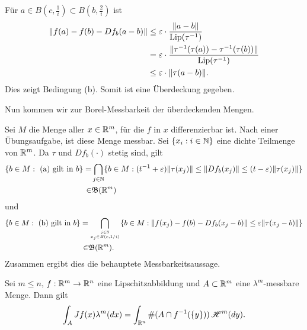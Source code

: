 \documentclass[a4paper,twoside,DIV15,BCOR12mm]{scrbook}
\newcommand{\HM}{\mathscr H}
\DeclareMathOperator{\Lip}{Lip}
\begin{document}
\begin{beweis}
Für $a\in B(c,\frac1i) \subset B(b,\frac2i)$ ist 
\begin{align*}
\|f(a) - f(b) - Df_b(a-b)\|
&\le \ep\cdot\frac{\|a-b\|}{\Lip(\tau^{-1})} \\
&= \ep\cdot\frac{\|\tau^{-1}(\tau(a)) - \tau^{-1}(\tau(b))\|}{\Lip(\tau^{-1})} \\
&\le \ep\cdot \|\tau(a-b)\|.
\end{align*}
Dies zeigt Bedingung (b). Somit ist eine Überdeckung gegeben.

Nun kommen wir zur Borel-Messbarkeit der überdeckenden Mengen.

Sei $M$ die Menge aller $x\in \mathbb{R}^m$, für die $f$ in $x$ differenzierbar ist. Nach einer 
Übungsaufgabe, ist diese Menge messbar. Sei $\{x_i:i\in \mathbb{N}\}$ eine dichte Teilmenge von $\mathbb{R}^m$. 
Da $\tau $ und $Df_b(\cdot)$ stetig sind, gilt
\begin{align*}
\{b\in M:\text{ (a) gilt in } b\}=&\bigcap_{j\in\mathbb{N}}\{b\in M:(t^{-1}+\varepsilon)\|\tau(x_j)\|\le \|Df_b(x_j)\|\le (t-\varepsilon)\|\tau(x_j)\|\}\\
\in &\mathfrak{B}(\mathbb{R}^m)
\end{align*}
und
\begin{align*}
\{b\in M:\text{ (b) gilt in } b\}=&\bigcap_{j\in\mathbb{N}\atop x_j\in B(c,1/i)}\{b\in M:
\|f(x_j)-f(b)-Df_b(x_j-b)\|\le\varepsilon\|\tau(x_j-b)\|\}\\
\in &\mathfrak{B}(\mathbb{R}^m).
\end{align*}
Zusammen ergibt dies die behauptete Messbarkeitsaussage.
\end{beweis}

\begin{satz}
Sei $m\le n$, $f:\mathbb{R}^m\to\mathbb{R}^n$ eine Lipschitzabbildung und $A\subset\mathbb{R}^m$ eine $\lambda^m$-messbare Menge. Dann gilt
\[
\int_A Jf(x) \lambda^m(dx) = \int_{\MdR^n} \#(A\cap f^{-1}(\{y\}))\,\HM^m(dy).
\]
\end{satz}
\end{document}
